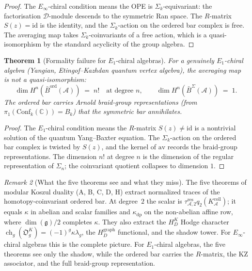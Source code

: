 \documentclass[11pt,reqno]{amsart}
\newtheorem{theorem}{Theorem}[section]
\theoremstyle{definition}
\theoremstyle{remark}
\newtheorem{remark}[theorem]{Remark}
\providecommand{\cA}{\mathcal{A}}
\providecommand{\cD}{\mathcal{D}}
\providecommand{\fg}{\mathfrak{g}}
\providecommand{\Conf}{\mathrm{Conf}}
\providecommand{\Eone}{E_1}
\providecommand{\Einf}{E_\infty}
\providecommand{\Barord}{\bar{B}^{\mathrm{ord}}}
\providecommand{\BarSig}{\bar{B}^{\Sigma}}
\providecommand{\bC}{\mathbb{C}}
\providecommand{\id}{\mathrm{id}}
\begin{document}
\begin{proof}
The $\Einf$-chiral condition means the OPE is
$\Sigma_k$-equivariant: the factorisation $\cD$-module
descends to the symmetric Ran space. The $R$-matrix
$S(z) = \id$ is the identity, and the $\Sigma_k$-action
on the ordered bar complex is free. The averaging map
takes $\Sigma_k$-coinvariants of a free action, which is
a quasi-isomorphism by the standard acyclicity of the
group algebra.
\end{proof}

\begin{theorem}[Formality failure for $\Eone$-chiral algebras]
\label{thm:e-formality-failure}
For a genuinely $\Eone$-chiral algebra \textup{(}Yangian,
Etingof--Kazhdan quantum vertex algebra\textup{)}, the
averaging map is \emph{not} a quasi-isomorphism:
\[
\dim H^n(\Barord(\cA))
\;=\; n!
\quad\text{at degree $n$},
\qquad
\dim H^n(\BarSig(\cA))
\;=\; 1.
\]
The ordered bar carries Arnold braid-group representations
(from $\pi_1(\Conf_k(\bC)) = B_k$) that the symmetric bar
annihilates.
\end{theorem}

\begin{proof}
The $\Eone$-chiral condition means the $R$-matrix
$S(z) \neq \id$ is a nontrivial solution of the quantum
Yang--Baxter equation. The $\Sigma_k$-action on the
ordered bar complex is twisted by $S(z)$, and the kernel
of $\mathrm{av}$ records the braid-group representations.
The dimension $n!$ at degree $n$ is the dimension of the
regular representation of $\Sigma_n$; the coinvariant
quotient collapses to dimension $1$.
\end{proof}

\begin{remark}[What the five theorems see and what they miss]
\label{rem:e-five-thms-see}
The five theorems of modular Koszul duality (A, B, C, D, H)
extract normalized traces of the homotopy-coinvariant ordered bar.
At degree~$2$ the scalar is
$\tau_{\cA,2}^{\mathrm{res}}q_2(K_\cA^{\mathrm{coll}})$; it equals
$\kappa$ in abelian and scalar families and $\kappa_{\mathrm{dp}}$
on the non-abelian affine row, where $\dim(\fg)/2$ completes
$\kappa$. They also extract the $H_D^K$ Hodge character
$\operatorname{ch}_g(\mathfrak O_g^K)=(-1)^g\kappa\lambda_g$,
the $H_D^{\mathrm{graph}}$ functional, and the shadow tower. For $\Einf$-chiral
algebras this is the complete picture. For $\Eone$-chiral
algebras, the five theorems see only the shadow, while the
ordered bar carries the $R$-matrix, the KZ associator, and
the full braid-group representation.
\end{remark}
\end{document}
